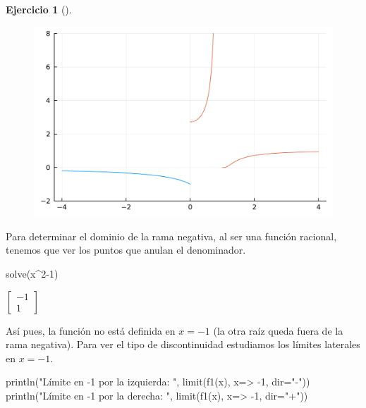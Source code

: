 \documentclass[
  a4paper,
]{scrreport}
\newenvironment{Shaded}{\begin{snugshade}}{\end{snugshade}}
\newcommand{\FloatTok}[1]{\textcolor[rgb]{0.68,0.00,0.00}{#1}}
\newcommand{\FunctionTok}[1]{\textcolor[rgb]{0.28,0.35,0.67}{#1}}
\newcommand{\NormalTok}[1]{\textcolor[rgb]{0.00,0.23,0.31}{#1}}
\newcommand{\OperatorTok}[1]{\textcolor[rgb]{0.37,0.37,0.37}{#1}}
\newcommand{\StringTok}[1]{\textcolor[rgb]{0.13,0.47,0.30}{#1}}
\theoremstyle{definition}
\newtheorem{exercise}{Ejercicio}[chapter]
\theoremstyle{remark}
\begin{document}
\begin{exercise}[]
\begin{tcolorbox}
\begin{figure}[H]

{\centering \includegraphics{./limites_files/figure-pdf/cell-33-output-1.pdf}

}

\end{figure}

Para determinar el dominio de la rama negativa, al ser una función
racional, tenemos que ver los puntos que anulan el denominador.

\begin{Shaded}
\begin{Highlighting}[]
\FunctionTok{solve}\NormalTok{(x}\OperatorTok{\^{}}\FloatTok{2}\OperatorTok{{-}}\FloatTok{1}\NormalTok{)}
\end{Highlighting}
\end{Shaded}

$\left[ \begin{array}{r}-1\\1\end{array} \right]$

Así pues, la función no está definida en \(x=-1\) (la otra raíz queda
fuera de la rama negativa). Para ver el tipo de discontinuidad
estudiamos los límites laterales en \(x=-1\).

\begin{Shaded}
\begin{Highlighting}[]
\FunctionTok{println}\NormalTok{(}\StringTok{"Límite en {-}1 por la izquierda: "}\NormalTok{, }\FunctionTok{limit}\NormalTok{(}\FunctionTok{f1}\NormalTok{(x), x}\OperatorTok{=\textgreater{}} \OperatorTok{{-}}\FloatTok{1}\NormalTok{, dir}\OperatorTok{=}\StringTok{"{-}"}\NormalTok{))}
\FunctionTok{println}\NormalTok{(}\StringTok{"Límite en {-}1 por la derecha: "}\NormalTok{, }\FunctionTok{limit}\NormalTok{(}\FunctionTok{f1}\NormalTok{(x), x}\OperatorTok{=\textgreater{}} \OperatorTok{{-}}\FloatTok{1}\NormalTok{, dir}\OperatorTok{=}\StringTok{"+"}\NormalTok{))}
\end{Highlighting}
\end{Shaded}


\end{tcolorbox}
\end{exercise}
\end{document}
